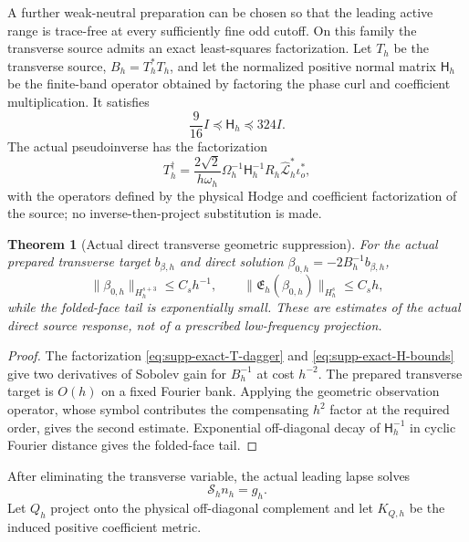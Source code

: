 \documentclass[11pt]{article}
\newtheorem{theorem}{Theorem}[section]
\numberwithin{equation}{section}
\theoremstyle{definition}
\theoremstyle{remark}
\begin{document}
A further weak-neutral preparation can be chosen so that the leading active
range is trace-free at every sufficiently fine odd cutoff.  On this family
the transverse source admits an exact least-squares factorization.  Let
$T_h$ be the transverse source, $B_h=T_h^*T_h$, and let the normalized
positive normal matrix $\mathsf H_h$ be the finite-band operator obtained by
factoring the phase curl and coefficient multiplication.  It satisfies
\begin{equation}
 \frac9{16}I\preceq\mathsf H_h\preceq324I.
 \label{eq:supp-exact-H-bounds}
\end{equation}
The actual pseudoinverse has the factorization
\begin{equation}
 T_h^\dagger=\frac{2\sqrt2}{h\omega_h}
 \Omega_h^{-1}\mathsf H_h^{-1}R_h\widehat{\mathcal L}_h^*\iota_o^*,
 \label{eq:supp-exact-T-dagger}
\end{equation}
with the operators defined by the physical Hodge and coefficient
factorization of the source; no inverse-then-project substitution is made.

\begin{theorem}[Actual direct transverse geometric suppression]
\label{thm:supp-exact-direct-transverse}
For the actual prepared transverse target $b_{\beta,h}$ and direct solution
$\beta_{0,h}=-2B_h^{-1}b_{\beta,h}$,
\begin{equation}
 \|\beta_{0,h}\|_{H_h^{s+3}}\le C_sh^{-1},
 \qquad \|\mathfrak E_h(\beta_{0,h})\|_{H_h^s}\le C_sh,
 \label{eq:supp-exact-direct-result}
\end{equation}
while the folded-face tail is exponentially small.  These are estimates of
the actual direct source response, not of a prescribed low-frequency
projection.
\end{theorem}
\begin{proof}
The factorization \eqref{eq:supp-exact-T-dagger} and
\eqref{eq:supp-exact-H-bounds} give two derivatives of Sobolev gain for
$B_h^{-1}$ at cost $h^{-2}$.  The prepared transverse target is $O(h)$ on a
fixed Fourier bank.  Applying the geometric observation operator, whose
symbol contributes the compensating $h^2$ factor at the required order,
gives the second estimate.  Exponential off-diagonal decay of
$\mathsf H_h^{-1}$ in cyclic Fourier distance gives the folded-face tail.
\end{proof}

After eliminating the transverse variable, the actual leading lapse solves
\begin{equation}
 \mathscr S_hn_h=g_h.
 \label{eq:supp-exact-scalar-equation}
\end{equation}
Let $Q_h$ project onto the physical off-diagonal complement and let
$K_{Q,h}$ be the induced positive coefficient metric.
\end{document}
